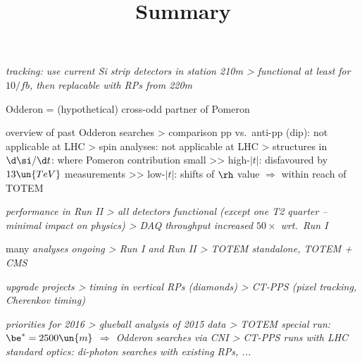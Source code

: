 \> \em{tracking: use current Si strip} detectors in station 210m
\>> functional at least for $10/fb$, then replacable with RPs from 220m


\newpage %

\> Odderon = (hypothetical) cross-odd partner of Pomeron

\> overview of past Odderon searches
\>> comparison pp vs.~anti-pp (dip): not applicable at LHC
\>> spin analyses: not applicable at LHC
\>> structures in $\d\si / \d t$: where Pomeron contribution small
\>>> high-$|t|$: disfavoured by $13\un{TeV}$ measurements
\>>> low-$|t|$: shifts of $\rh$ value $\Rightarrow$ within reach of TOTEM




\newpage %
\title{Summary}

\> \em{performance} in Run II
\>> all detectors functional (except one T2 quarter -- minimal impact on physics)
\>> DAQ throughput increased $50\times$ wrt.~Run I

\> many \em{analyses} ongoing
\>> Run I and Run II
\>> TOTEM standalone, TOTEM + CMS

\> \em{upgrade} projects
\>> timing in vertical RPs (diamonds)
\>> CT-PPS (pixel tracking, Cherenkov timing)

\> \em{priorities} for 2016
\>> glueball analysis of 2015 data
\>> TOTEM special run: $\be^* = 2500\un{m}$ $\Rightarrow$ Odderon searches via CNI
\>> CT-PPS runs with LHC standard optics: di-photon searches with existing RPs, ...



